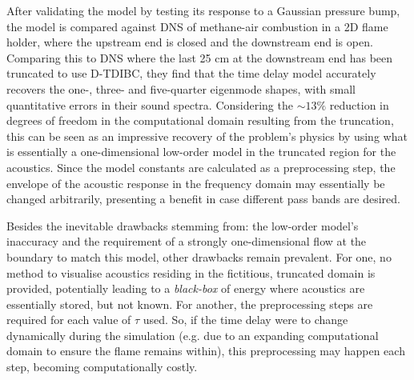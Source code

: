 After validating the model by testing its response to a Gaussian pressure bump, the model is compared against DNS of methane-air combustion in a 2D flame holder, where the upstream end is closed and the downstream end is open. Comparing this to DNS where the last 25 cm at the downstream end has been truncated to use D-TDIBC, they find that the time delay model accurately recovers the one-, three- and five-quarter eigenmode shapes, with small quantitative errors in their sound spectra. Considering the $\sim 13\%$ reduction in degrees of freedom in the computational domain resulting from the truncation, this can be seen as an impressive recovery of the problem's physics by using what is essentially a one-dimensional low-order model in the truncated region for the acoustics. Since the model constants are calculated as a preprocessing step, the envelope of the acoustic response in the frequency domain may essentially be changed arbitrarily, presenting a benefit in case different pass bands are desired.

Besides the inevitable drawbacks stemming from: the low-order model's inaccuracy and the requirement of a strongly one-dimensional flow at the boundary to match this model, other drawbacks remain prevalent. For one, no method to visualise acoustics residing in the fictitious, truncated domain is provided, potentially leading to a \emph{black-box} of energy where acoustics are essentially stored, but not known. For another, the preprocessing steps are required for each value of $τ$ used. So, if the time delay were to change dynamically during the simulation (e.g. due to an expanding computational domain to ensure the flame remains within), this preprocessing may happen each step, becoming computationally costly.





